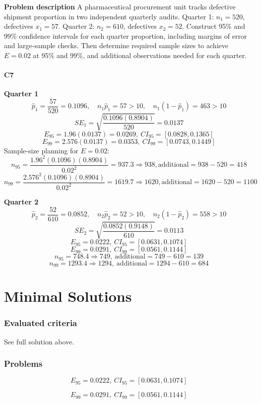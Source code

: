 \begin{ExamProblems}
		\newpage
		\item
		\textbf{Problem description}
		A pharmaceutical procurement unit tracks defective shipment proportion in two independent quarterly audits.
		Quarter 1: $n_1=520$, defectives $x_1=57$.
		Quarter 2: $n_2=610$, defectives $x_2=52$.
		Construct 95\% and 99\% confidence intervals for each quarter proportion, including margins of error and large-sample checks.
		Then determine required sample sizes to achieve $E=0.02$ at 95\% and 99\%, and additional observations needed for each quarter.
		
		\subsection*{C7}
		\textbf{Quarter 1}
		\[
		\hat{p}_1=\frac{57}{520}=0.1096,
		\quad n_1\hat{p}_1=57>10,
		\quad n_1(1-\hat{p}_1)=463>10
		\]
		\[
		SE_1=\sqrt{\frac{0.1096(0.8904)}{520}}=0.0137
		\]
		\[
		E_{95}=1.96(0.0137)=0.0269,\ CI_{95}=[0.0828,0.1365]
		\]
		\[
		E_{99}=2.576(0.0137)=0.0353,\ CI_{99}=[0.0743,0.1449]
		\]
		Sample-size planning for $E=0.02$:
		\[
		n_{95}=\frac{1.96^2(0.1096)(0.8904)}{0.02^2}=937.3\Rightarrow938,
		\text{additional}=938-520=418
		\]
		\[
		n_{99}=\frac{2.576^2(0.1096)(0.8904)}{0.02^2}=1619.7\Rightarrow1620,
		\text{additional}=1620-520=1100
		\]
		
		\textbf{Quarter 2}
		\[
		\hat{p}_2=\frac{52}{610}=0.0852,
		\quad n_2\hat{p}_2=52>10,
		\quad n_2(1-\hat{p}_2)=558>10
		\]
		\[
		SE_2=\sqrt{\frac{0.0852(0.9148)}{610}}=0.0113
		\]
		\[
		E_{95}=0.0222,\ CI_{95}=[0.0631,0.1074]
		\]
		\[
		E_{99}=0.0291,\ CI_{99}=[0.0561,0.1144]
		\]
		\[
		n_{95}=748.4\Rightarrow749,\ \text{additional}=749-610=139
		\]
		\[
		n_{99}=1293.4\Rightarrow1294,\ \text{additional}=1294-610=684
		\]

	\end{ExamProblems}


\part{Minimal Solutions}

\section*{Evaluated criteria}
See full solution above.

\section*{Problems}
\[E_{95}=0.0222,\ CI_{95}=[0.0631,0.1074]\]

\[E_{99}=0.0291,\ CI_{99}=[0.0561,0.1144]\]


